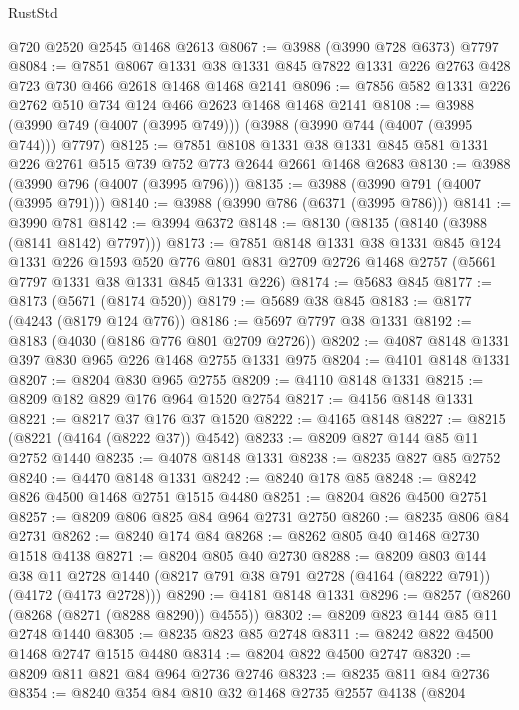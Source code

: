\begin{lexlean}{RustStd}
\begin{coremodule}
    @720
    @2520
    @2545
    @1468
    @2613
@8067 := @3988 (@3990 @728 @6373) @7797
@8084 := @7851
    @8067
    @1331
    @38
    @1331
    @845
    @7822
    @1331
    @226
    @2763
    @428
    @723
    @730
    @466
    @2618
    @1468
    @1468
    @2141
@8096 := @7856 @582 @1331 @226 @2762 @510 @734 @124 @466 @2623 @1468 @1468 @2141
@8108 := @3988 (@3990 @749 (@4007 (@3995 @749))) (@3988 (@3990 @744 (@4007 (@3995 @744))) @7797)
@8125 := @7851
    @8108
    @1331
    @38
    @1331
    @845
    @581
    @1331
    @226
    @2761
    @515
    @739
    @752
    @773
    @2644
    @2661
    @1468
    @2683
@8130 := @3988 (@3990 @796 (@4007 (@3995 @796)))
@8135 := @3988 (@3990 @791 (@4007 (@3995 @791)))
@8140 := @3988 (@3990 @786 (@6371 (@3995 @786)))
@8141 := @3990 @781
@8142 := @3994 @6372
@8148 := @8130 (@8135 (@8140 (@3988 (@8141 @8142) @7797)))
@8173 := @7851
    @8148
    @1331
    @38
    @1331
    @845
    @124
    @1331
    @226
    @1593
    @520
    @776
    @801
    @831
    @2709
    @2726
    @1468
    @2757
    (@5661 @7797 @1331 @38 @1331 @845 @1331 @226)
@8174 := @5683 @845
@8177 := @8173 (@5671 (@8174 @520))
@8179 := @5689 @38 @845
@8183 := @8177 (@4243 (@8179 @124 @776))
@8186 := @5697 @7797 @38 @1331
@8192 := @8183 (@4030 (@8186 @776 @801 @2709 @2726))
@8202 := @4087 @8148 @1331 @397 @830 @965 @226 @1468 @2755 @1331 @975
@8204 := @4101 @8148 @1331
@8207 := @8204 @830 @965 @2755
@8209 := @4110 @8148 @1331
@8215 := @8209 @182 @829 @176 @964 @1520 @2754
@8217 := @4156 @8148 @1331
@8221 := @8217 @37 @176 @37 @1520
@8222 := @4165 @8148
@8227 := @8215 (@8221 (@4164 (@8222 @37)) @4542)
@8233 := @8209 @827 @144 @85 @11 @2752 @1440
@8235 := @4078 @8148 @1331
@8238 := @8235 @827 @85 @2752
@8240 := @4470 @8148 @1331
@8242 := @8240 @178 @85
@8248 := @8242 @826 @4500 @1468 @2751 @1515 @4480
@8251 := @8204 @826 @4500 @2751
@8257 := @8209 @806 @825 @84 @964 @2731 @2750
@8260 := @8235 @806 @84 @2731
@8262 := @8240 @174 @84
@8268 := @8262 @805 @40 @1468 @2730 @1518 @4138
@8271 := @8204 @805 @40 @2730
@8288 := @8209
    @803
    @144
    @38
    @11
    @2728
    @1440
    (@8217 @791 @38 @791 @2728 (@4164 (@8222 @791)) (@4172 (@4173 @2728)))
@8290 := @4181 @8148 @1331
@8296 := @8257 (@8260 (@8268 (@8271 (@8288 @8290)) @4555))
@8302 := @8209 @823 @144 @85 @11 @2748 @1440
@8305 := @8235 @823 @85 @2748
@8311 := @8242 @822 @4500 @1468 @2747 @1515 @4480
@8314 := @8204 @822 @4500 @2747
@8320 := @8209 @811 @821 @84 @964 @2736 @2746
@8323 := @8235 @811 @84 @2736
@8354 := @8240
    @354
    @84
    @810
    @32
    @1468
    @2735
    @2557
    @4138
    (@8204

\end{coremodule}
\end{lexlean}
